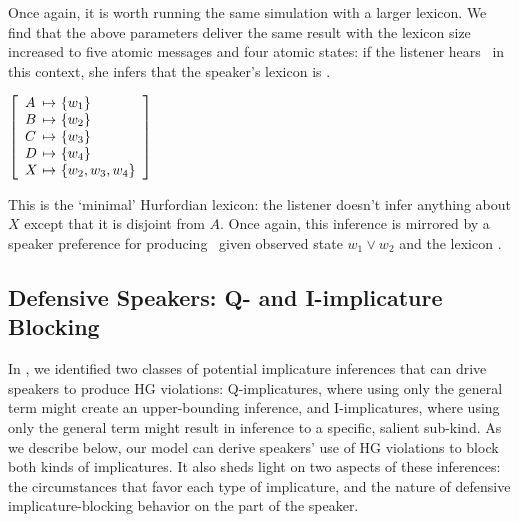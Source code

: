 \documentclass[12pt,twoside]{article}
\renewcommand{\_}{\textbf{\textunderscore\hspace{-4pt}\textunderscore\hspace{-3pt}\textunderscore\hspace{-4pt}\textunderscore}\hspace{0.5pt}}			%
\begin{document}
Once again, it is worth running the same simulation with a larger
lexicon. We find that the above parameters deliver the same result
with the lexicon size increased to five atomic messages and four
atomic states: if the listener hears \AorX\ in this context,
she infers that the speaker's lexicon is .
%
\begin{exe}
\ex\label{hurford-lex-large}  
  $\left[
    \begin{array}[c]{l@{ \ \mapsto \ }l}
      A & \set{w_{1}} \\
      B & \set{w_{2}} \\
      C & \set{w_{3}} \\
      D & \set{w_{4}} \\
      X & \set{w_{2}, w_{3}, w_{4}}
    \end{array}
  \right]$
\end{exe}
%
This is the `minimal' Hurfordian lexicon: the listener doesn't infer
anything about $X$ except that it is disjoint from $A$. Once again,
this inference is mirrored by a speaker preference for producing
\AorX\ given observed state $w_{1} \vee w_{2}$ and the lexicon
.


\subsection{Defensive Speakers: Q- and I-implicature Blocking}
\label{sec:defensive-speakers}

In , we identified two classes of
potential implicature inferences that can drive speakers to produce HG
violations: Q-implicatures, where using only the general term might
create an upper-bounding inference, and I-implicatures, where using
only the general term might result in inference to a specific, salient
sub-kind. As we describe below, our model can derive speakers' use of
HG violations to block both kinds of implicatures. It also sheds light
on two aspects of these inferences: the circumstances that favor each
type of implicature, and the nature of defensive implicature-blocking
behavior on the part of the speaker.
\end{document}
